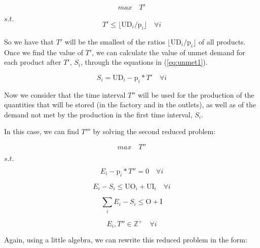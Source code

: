 \documentclass[authoryear,preprint,12pt]{elsarticle}
\begin{document}
\begin{equation}
max \quad T'
\end{equation}

$s.t.$ \\

\begin{equation}
T'  \leq \lfloor{\textrm{UD}_i / \textrm{p}_i}\rfloor \quad \forall i
\end{equation}

So we have that $T'$ will be the smallest of the ratios $\lfloor{\textrm{UD}_i / \textrm{p}_i}\rfloor$ of all products. \\

Once we find the value of $T'$, we can calculate the value of unmet demand for each product after $T'$, $S_i$, through the equations in (\ref{eq:unmet1}).

\begin{equation}
\label{eq:unmet1}
S_i = \textrm{UD}_i - \textrm{p}_i * T' \quad \forall i
\end{equation}

Now we consider that the time interval $T''$ will be used for the production of the quantities that will be stored (in the factory and in the outlets), as well as of the demand not met by the production in the first time interval, $S_i$. 

In this case, we can find $T'''$ by solving the second reduced problem:

\begin{equation}
max \quad T''
\end{equation}

$s.t.$

\begin{equation}
E_i - \textrm{p}_i * T''  = 0 \quad \forall i
\end{equation}

\begin{equation}
E_i - S_i \leq \textrm{UO}_i + \textrm{UI}_i \quad \forall i
\end{equation}

\begin{equation}
\sum_i {E_i - S_i} \leq \textrm{O} + \textrm{I}
\end{equation}

\begin{equation}
E_i, T'' \in  \mathbb{Z}^+ \quad \forall i
\end{equation}

Again, using a little algebra, we can rewrite this reduced problem in the form:
\end{document}
